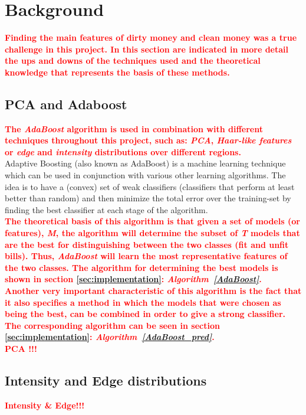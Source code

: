 \documentclass[11pt,twocolumn]{article}
\newcommand{\todo}[1]{\textcolor{red}{\textbf{#1}}}
\begin{document}
	\section{Background}\label{sec:background}
	\todo{\hspace*{10px}Finding the main features of dirty money and clean money was a true challenge in this project. In this section are indicated in more detail the ups and downs of the techniques used and the theoretical knowledge that represents the basis of these methods.}
	\subsection{PCA and Adaboost}\label{sec:PCA}
		\todo{\hspace*{10px}The \emph{AdaBoost} algorithm is used in combination with different techniques throughout this project, such as: \emph{PCA}, \emph{Haar-like features} or \emph{edge} and \emph{intensity} distributions over different regions.\\}
		\hspace*{10px}Adaptive Boosting (also known as AdaBoost) is a machine learning technique which can be used in conjunction with various other learning algorithms. The idea is to have a (convex) set of weak classifiers (classifiers that perform at least better than random) and then minimize the total error over the training-set by finding the best classifier at each stage of the algorithm.\\
		\todo{\hspace*{10px}The theoretical basis of this algorithm is that given a set of models (or features), \emph{M}, the algorithm will determine the subset of \emph{T} models that are the best for distinguishing between the two classes (fit and unfit bills). Thus, \emph{AdaBoost} will learn the most representative features of the two classes. The algorithm for determining the best models is shown in section \ref{sec:implementation}: \emph{Algorithm~\ref{AdaBoost}}.\\}
		\todo{\hspace*{10px}Another very important characteristic of this algorithm is the fact that it also specifies a method in which the models that were chosen as being the best, can be combined in order to give a strong classifier. The corresponding algorithm can be seen in section \ref{sec:implementation}: \emph{Algorithm~\ref{AdaBoost_pred}}.\\}
		\todo{\hspace*{10px}PCA !!!}
	\subsection{Intensity and Edge distributions}\label{sec:Intensity_Edge}
		\todo{\hspace*{10px}Intensity \& Edge!!!\\}
\end{document}
